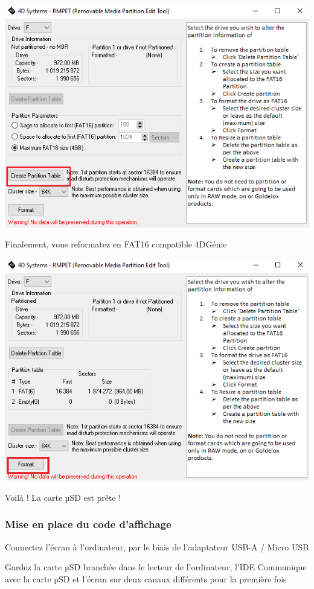 \documentclass[11pt]{article}
\begin{document}
\includegraphics[width=\textwidth]{Format7.png}

Finalement, vous reformatez en FAT16 compatible 4DGénie

\includegraphics[width=\textwidth]{Format8.png}

Voilà ! La carte µSD est prête !

\newpage 
\subsubsection{Mise en place du code d'affichage}

Connectez l'écran à l'ordinateur, par le biais de l'adaptateur USB-A / Micro USB

Gardez la carte µSD branchée dans le lecteur de l'ordinateur, l'IDE Communique avec la carte µSD et l'écran sur deux canaux différents pour la première fois
\end{document}
